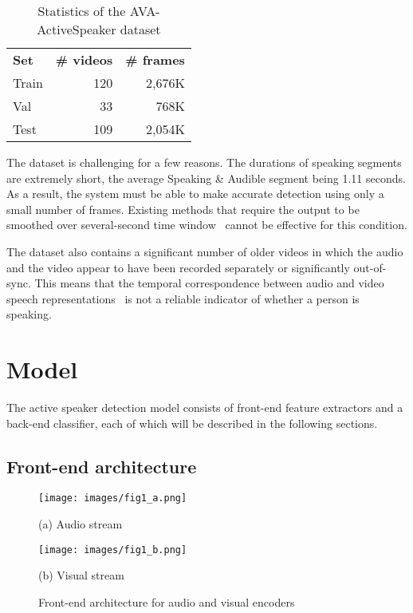 \documentclass[10pt,twocolumn,letterpaper]{article}
\begin{document}
\begin{table}[ht] 
\setlength{\tabcolsep}{10pt}
\begin{center}
\begin{tabular}{ l r r } 
&  \\  \hline
 \bf{Set}  & \bf{\# videos} &  \bf{\# frames} \\  \hline
 Train  & 120 &  2,676K \\
 Val  & 33 &  768K \\ 
   Test  & 109 &  2,054K \\  \hline
 
\end{tabular}             
\end{center}
\caption{Statistics of the AVA-ActiveSpeaker dataset}
\label{tab:data}
\end{table}

The dataset is challenging for a few reasons. The durations of speaking segments are extremely short, the average Speaking \& Audible segment being 1.11 seconds. As a result, the system must be able to make accurate detection using only a small number of frames. Existing methods that require the output to be smoothed over several-second time window~\cite{chakravarty2016cross,chung2016out} cannot be effective for this condition.

The dataset also contains a significant number of older videos in which the audio and the video appear to have been recorded separately or significantly out-of-sync. This means that the temporal correspondence between audio and video speech representations~\cite{chung2016out} is not a reliable indicator of whether a person is speaking.

\section{Model}

The active speaker detection model consists of front-end feature extractors and a back-end classifier, each of which will be described in the following sections.


\subsection{Front-end architecture}

\begin{figure}[ht]
\begin{minipage}[b]{0.49\linewidth}
  \centering
  \centerline{\texttt{[image: images/fig1\_a.png]}}
  \centerline{(a) Audio stream}\medskip
\end{minipage}
\begin{minipage}[b]{0.49\linewidth}
  \centering
  \centerline{\texttt{[image: images/fig1\_b.png]}}
  \centerline{(b) Visual stream}\medskip
\end{minipage}
\caption{Front-end architecture for audio and visual encoders}
\label{fig:streams}
\end{figure}
\end{document}
